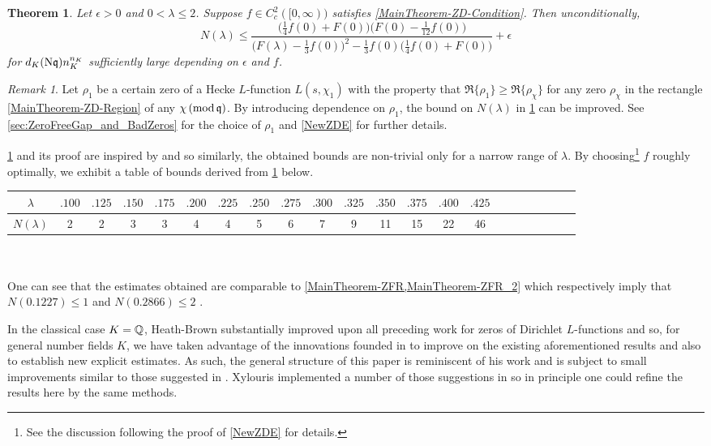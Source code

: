 \documentclass[12pt,psamsfonts]{amsart}
\newtheorem{thm}{Theorem}[section]
\theoremstyle{definition}
\theoremstyle{remark}
\newtheorem*{rem*}{Remark}
\numberwithin{equation}{section}
\begin{document}
\begin{thm} \label{MainTheorem-ZD} Let $\epsilon > 0$ and $0 < \lambda \leq 2$. Suppose $f \in C_c^2([0,\infty))$ satisfies \eqref{MainTheorem-ZD-Condition}. Then unconditionally, 
\[
N(\lambda)\leq 
\frac{\Big(\tfrac{1}{4}f(0) + F(0) \Big)\Big( F(0) - \tfrac{1}{12} f(0) \Big)}
{\Big( F(\lambda) - \tfrac{1}{3}f(0) \Big)^2  - \tfrac{1}{3}f(0) \Big(\tfrac{1}{4}f(0)+ F(0) \Big)} + \epsilon
\]
for $d_K(\mathrm{N}\mathfrak{q})n_K^{n_K}$ sufficiently large depending on $\epsilon$ and $f$. 
\end{thm}
\begin{rem*} Let $\rho_1$ be a certain zero of a Hecke $L$-function $L(s,\chi_1)$ with the property that $\Re\{\rho_1\} \geq \Re\{\rho_{\chi}\}$ for any zero $\rho_{\chi}$ in the rectangle \eqref{MainTheorem-ZD-Region} of any $\chi \, (\mathrm{mod} {\, \mathfrak{q}})$. By introducing dependence on $\rho_1$, the bound on $N(\lambda)$ in \cref{MainTheorem-ZD} can be improved. See \cref{sec:ZeroFreeGap_and_BadZeros} for the choice of $\rho_1$ and \cref{NewZDE} for further details. 
\end{rem*}
\cref{MainTheorem-ZD} and its proof are inspired by \cite[Section 12]{HBLinnik} and so similarly, the obtained bounds are non-trivial only for a narrow range of $\lambda$. By choosing\footnote{See the discussion following the proof of \cref{NewZDE} for details.} $f$ roughly optimally, we exhibit a table of bounds derived from \cref{MainTheorem-ZD} below.
\vspace{5mm}

\hspace*{-0.2in}
\begin{tabular}{c|c|c|c|c|c|c|c|c|c|c|c|c|c|c|c|c|c|c|c|c|c} 
$\lambda $ & $.100$ & $.125$ & $.150$ & $.175$ & $.200$ & $.225$ & $.250$ & $.275$ & $.300$ & $.325$ & $.350$ & $.375$ & $.400$ & $.425$ \\ 
 \hline 
$N(\lambda)$ & \vspace*{0.1in}  2 &  2 &  3 &  3 &  4 &  4 &  5 &  6 &  7 &  9 &  11 &  15 &  22 &  46   \\ 
\end{tabular} \\\\
\noindent
One can see that the estimates obtained are comparable to \cref{MainTheorem-ZFR,MainTheorem-ZFR_2} which respectively imply that $N(0.1227) \leq 1$ and $N(0.2866) \leq 2$ . 

In the classical case $K = \mathbb{Q}$, Heath-Brown substantially improved upon all preceding work for zeros of Dirichlet $L$-functions and so, for general number fields $K$, we have taken advantage of the innovations founded in \cite{HBLinnik} to improve on the existing aforementioned results and also to establish new explicit estimates. As such, the general structure of this paper is reminiscent of his work and is subject to small improvements similar to those suggested in \cite[Section 16]{HBLinnik}. Xylouris implemented a number of those suggestions in \cite{Xylouris} so in principle one could refine the results here  by the same methods. 
\end{document}
